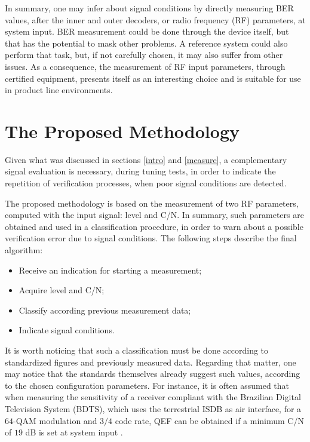 \documentclass[conference]{IEEEtran}
\begin{document}
In summary, one may infer about signal conditions by directly measuring BER values, after the inner and outer decoders, or radio frequency (RF) parameters, at system input. BER measurement could be done through the device itself, but that has the potential to mask other problems. A reference system could also perform that task, but, if not carefully chosen, it may also suffer from other issues. As a consequence, the measurement of RF input parameters, through certified equipment, presents itself as an interesting choice and is suitable for use in product line environments.

\section{The Proposed Methodology}\label{metho}
Given what was discussed in sections \ref{intro} and \ref{measure}, a complementary signal evaluation is necessary, during tuning tests, in order to indicate the repetition of verification processes, when poor signal conditions are detected. 

The proposed methodology is based on the measurement of two RF parameters, computed with the input signal: level and C/N. In summary, such parameters are obtained and used in a classification procedure, in order to warn about a possible verification error due to signal conditions. The following steps describe the final algorithm:

\begin{itemize}
	\item Receive an indication for starting a measurement;
	\item Acquire level and C/N;
	\item Classify according previous measurement data;
	\item Indicate signal conditions.
\end{itemize}

It is worth noticing that such a classification must be done according to standardized figures and previously measured data. Regarding that matter, one may notice that the standards themselves already suggest such values, according to the chosen configuration parameters. For instance, it is often assumed that when measuring the sensitivity of a receiver compliant with the Brazilian Digital Television System (BDTS), which uses the terrestrial ISDB as air interface, for a $64$-QAM modulation and $3/4$ code rate, QEF can be obtained if a minimum C/N of $19$ dB is set at system input \cite{sbtvd}. 
\end{document}
